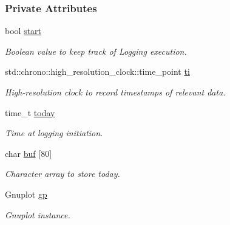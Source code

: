 \subsubsection*{Private Attributes}
\begin{DoxyCompactItemize}
\item 
bool \hyperlink{classLogger_a99c616f02a46e95f2e976ab7d880dbc5}{start}
\begin{DoxyCompactList}\small\item\em Boolean value to keep track of Logging execution. \end{DoxyCompactList}\item 
std\+::chrono\+::high\+\_\+resolution\+\_\+clock\+::time\+\_\+point \hyperlink{classLogger_a7f6f65922677036ca61ba12a19fdb719}{ti}
\begin{DoxyCompactList}\small\item\em High-\/resolution clock to record timestamps of relevant data. \end{DoxyCompactList}\item 
time\+\_\+t \hyperlink{classLogger_afe5c4b612d69878aa65ce940a042fd8c}{today}
\begin{DoxyCompactList}\small\item\em Time at logging initiation. \end{DoxyCompactList}\item 
char \hyperlink{classLogger_a0fd4efa39e08c0253f59f76e08abefee}{buf} \mbox{[}80\mbox{]}
\begin{DoxyCompactList}\small\item\em Character array to store today. \end{DoxyCompactList}\item 
Gnuplot \hyperlink{classLogger_a63eca256c57dee44717f3002654887c7}{gp}
\begin{DoxyCompactList}\small\item\em Gnuplot instance. \end{DoxyCompactList}\end{DoxyCompactItemize}
{\bf }\par
